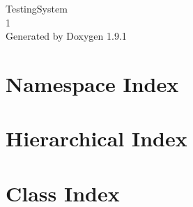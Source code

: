 \let\mypdfximage\pdfximage\def\pdfximage{\immediate\mypdfximage}\documentclass[twoside]{book}
\newcommand{\+}{\discretionary{\mbox{\scriptsize$\hookleftarrow$}}{}{}}
\newcommand{\clearemptydoublepage}{%
  \newpage{\pagestyle{empty}\cleardoublepage}%
}
\begin{document}
\raggedbottom

\hypersetup{pageanchor=false,
             bookmarksnumbered=true,
             pdfencoding=unicode
            }
\begin{titlepage}
\vspace*{7cm}
\begin{center}%
{\Large Testing\+System \\[1ex]\large 1 }\\
\vspace*{1cm}
{\large Generated by Doxygen 1.9.1}\\
\end{center}
\end{titlepage}
\clearemptydoublepage
{}
\tableofcontents
\clearemptydoublepage
{}
\hypersetup{pageanchor=true}

\chapter{Namespace Index}

\chapter{Hierarchical Index}

\chapter{Class Index}

\end{document}
